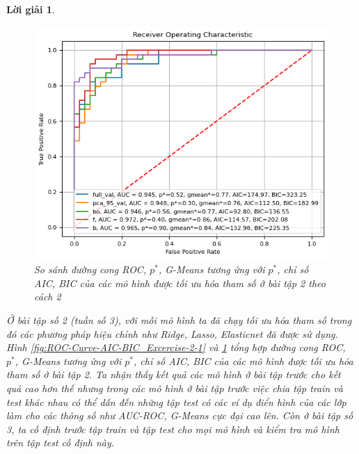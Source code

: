\documentclass[14pt, a4paper]{article}
\theoremstyle{sltheorem}
\theoremstyle{soltheorem}
\newtheorem*{loigiai}{Lời giải}
\begin{document}
\begin{loigiai}
    \begin{figure}[h!]
        \centering
        \includegraphics[width=1.0\textwidth]{figures/ROC_Curve_AIC_BIC_Excercise_2_2.png}
        \caption{ So sánh đường cong ROC, $p^*$, G-Means tương ứng với $p^*$, chỉ số AIC, BIC của các mô hình được tối ưu hóa tham số ở bài tập 2 theo cách 2}
        \label{fig:ROC-Curve-AIC-BIC_Excercise-2-2}
    \end{figure}

    Ở bài tập số 2 (tuần số 3), với mỗi mô hình ta đã chạy tối ưu hóa tham số trong đó các phương pháp hiệu chỉnh như Ridge, Lasso, Elasticnet đã được sử dụng.
    Hình \ref{fig:ROC-Curve-AIC-BIC_Excercise-2-1} và \ref{fig:ROC-Curve-AIC-BIC_Excercise-2-2} tổng hợp đường cong ROC, $p^*$, G-Means tương ứng với $p^*$, chỉ số AIC, BIC của các mô hình được tối ưu hóa tham số ở bài tập 2.
    Ta nhận thấy kết quả các mô hình ở bài tập trước cho kết quả cao hơn thế nhưng trong các mô hình ở bài tập trước việc chia tập train và test khác nhau có thể dẫn đến những tập test có các ví dụ điển hình của các lớp làm cho các thông số như AUC-ROC, G-Means cực đại cao lên.
    Còn ở bài tập số 3, ta cố định trước tập train và tập test cho mọi mô hình và kiểm tra mô hình trên tập test cố định này.
\end{loigiai}

\newpage
\end{document}
